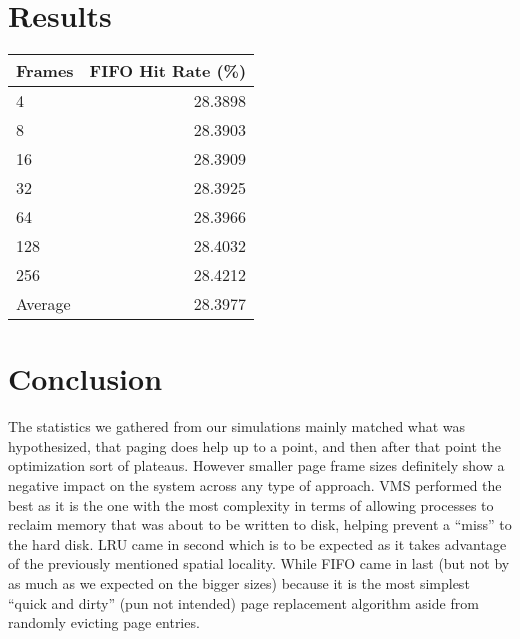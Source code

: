 \documentclass[12pt,letterpaper]{article}
\begin{document}
	\section{Results}
	
	\begin{center}
	\begin{tabular}{l | r }
		Frames & FIFO Hit Rate (\%) \\ \hline
		4 & 28.3898 \\
		8 & 28.3903  \\
		16 & 28.3909 \\
		32 & 28.3925 \\
		64 & 28.3966 \\
		128 & 28.4032 \\
		256 & 28.4212 \\ \hline
		Average & 28.3977
	\end{tabular}

	
	
	\end{center}


	\section{Conclusion}
	The statistics we gathered from our simulations mainly matched what was hypothesized, that paging does help up to a point, and then after that point the optimization sort of plateaus. However smaller page frame sizes definitely show a negative impact on the system across any type of approach. VMS performed the best as it is the one with the most complexity in terms of allowing processes to reclaim memory that was about to be written to disk, helping prevent a ``miss'' to the hard disk. LRU came in second which is to be expected as it takes advantage of the previously mentioned spatial locality. While FIFO came in last (but not by as much as we expected on the bigger sizes) because it is the most simplest ``quick and dirty'' (pun not intended) page replacement algorithm aside from randomly evicting page entries.
	
\end{document}
